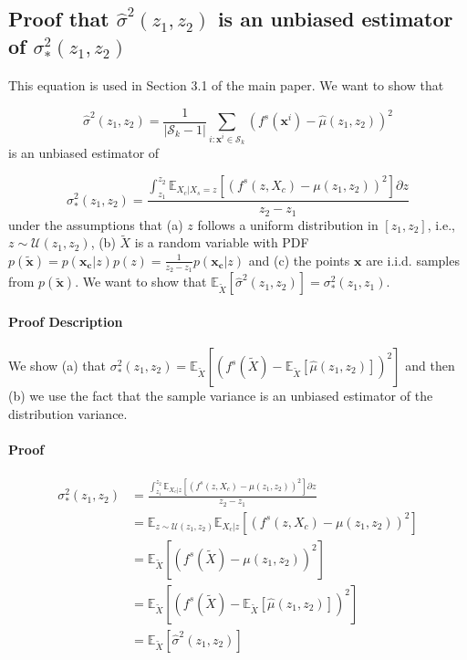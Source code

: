 \documentclass{article} %
\newcommand{\xc}{\mathbf{x_c}}
\newcommand{\xb}{\mathbf{x}}
\begin{document}
\subsection{Proof that \(\hat{\sigma}^2(z_1, z_2)\) is an unbiased estimator of \(\sigma_*^2(z_1, z_2)\)}
\label{sec:proof-2}

This equation is used in Section 3.1 of the main paper.
We want to show that

\[\hat{\sigma}^2(z_1, z_2) = \frac{1}{|\mathcal{S}_k - 1|}
\sum_{i:\mathbf{x}^i \in \mathcal{S}_k} \left ( f^s(\mathbf{x}^i) -
  \hat{\mu}(z_1, z_2) \right )^2\]
%
is an unbiased estimator of

\[\sigma^2_*(z_1, z_2) = \frac{\int_{z_1}^{z_2} \mathbb{E}_{X_c|X_s=z}
  \left [ (f^s(z, X_c) - \mu(z_1, z_2) )^2 \right] \partial z}{z_2 -
  z_1} \]
%
under the assumptions that (a) \(z\) follows a uniform distribution
in \([z_1, z_2]\), i.e., \(z \sim \mathcal{U}(z_1, z_2)\), (b)
\(\tilde{X}\) is a random variable with PDF
\(p(\tilde{\xb}) = p(\xc|z)p(z) = \frac{1}{z_2-z_1}p(\xc|z) \) and (c)
the points \(\mathbf{x}\) are i.i.d. samples from
\(p(\tilde{\xb})\). We want to show that
\(\mathbb{E}_{\tilde{X}} [\hat{\sigma}^2(z_1, z_2)] = \sigma_*^2(z_1, z_1)\).

\paragraph{Proof Description}

We show (a) that
\(\sigma^2_*(z_1, z_2) = \mathbb{E}_{\tilde{X}} \left [ (f^s(\tilde{X}) - \mathbb{E}_{\tilde{X}}[\hat{\mu}(z_1, z_2)] )^2 \right]\) and
then (b) we use the fact that the sample variance is an unbiased
estimator of the distribution variance.

\paragraph{Proof}


\begin{align}
  \sigma^2_*(z_1, z_2) & = \frac{\int_{z_1}^{z_2} \mathbb{E}_{X_c|z}
                         \left [ (f^s(z, X_c) - \mu(z_1, z_2) )^2 \right] \partial z}{z_2 -
                         z_1} \\
                       & = \mathbb{E}_{z \sim \mathcal{U}(z_1, z_2)}\mathbb{E}_{X_c|z}
                         \left [ (f^s(z, X_c) - \mu(z_1, z_2) )^2 \right] \\
                       & = \mathbb{E}_{\tilde{X}} \left [ (f^s(\tilde{X}) - \mu(z_1, z_2) )^2 \right]\\
                       & = \mathbb{E}_{\tilde{X}} \left [ (f^s(\tilde{X}) - \mathbb{E}_{\tilde{X}}[\hat{\mu}(z_1, z_2)] )^2 \right]\\
                       & = \mathbb{E}_{\tilde{X}} \left [ \hat{\sigma}^2(z_1, z_2)  \right]
  \end{align}
\end{document}
